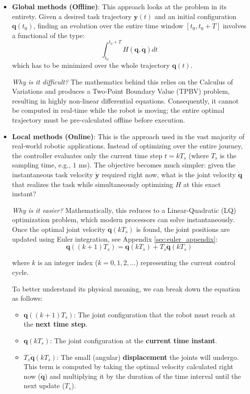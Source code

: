\begin{itemize}
    \item \textbf{Global methods (Offline)}: This approach looks at the problem in its entirety. Given a desired task trajectory $\mathbf{y}(t)$ and an initial configuration $\mathbf{q}(t_0)$, 
    finding an evolution over the entire time window $[t_0, t_0+T]$ involves a functional of the type:
    \begin{equation}
        \int_{t_0}^{t_0+T} H(\mathbf{q}, \dot{\mathbf{q}}) dt   
    \end{equation}
    which has to be minimized over the whole trajectory $\mathbf{q}(t)$. 
    
    \textit{Why is it difficult?} The mathematics behind this relies on the Calculus of Variations and produces a Two-Point Boundary Value (TPBV) problem, 
    resulting in highly non-linear differential equations. Consequently, it cannot be computed in real-time while the robot is moving; the entire optimal trajectory must be pre-calculated 
    offline before execution.
    
    \item \textbf{Local methods (Online)}: This is the approach used in the vast majority of real-world robotic applications. Instead of optimizing over the entire journey, 
    the controller evaluates only the current time step $t = k T_s$ (where $T_s$ is the sampling time, e.g., $1$ ms). 
    The objective becomes much simpler: given the instantaneous task velocity $\dot{\mathbf{y}}$ required right now, what is the joint velocity $\dot{\mathbf{q}}$ that realizes the 
    task while simultaneously optimizing $H$ at this exact instant?

    \textit{Why is it easier?} Mathematically, this reduces to a Linear-Quadratic (LQ) optimization problem, which modern processors can solve instantaneously. Once the optimal joint 
    velocity $\dot{\mathbf{q}}(kT_s)$ is found, the joint positions are updated using Euler integration, see Appendix \ref{sec:euler_appendix}:
    \begin{equation}
        \mathbf{q}((k+1)T_s) = \mathbf{q}(kT_s) + T_s \dot{\mathbf{q}}(kT_s)
    \end{equation}

where $k$ is an integer index ($k = 0, 1, 2, \dots$) representing the current control cycle. 

To better understand its physical meaning, we can break down the equation as follows:
    \begin{itemize}
        \item $\mathbf{q}((k+1)T_s)$: The joint configuration that the robot must reach at the \textbf{next time step}.
        \item $\mathbf{q}(kT_s)$: The joint configuration at the \textbf{current time instant}.
        \item $T_s \dot{\mathbf{q}}(kT_s)$: The small (angular) \textbf{displacement} the joints will undergo. 
        This term is computed by taking the optimal velocity calculated right now ($\dot{\mathbf{q}}$) and multiplying it by the duration of the time interval 
        until the next update ($T_s$).
    \end{itemize}


\end{itemize}
